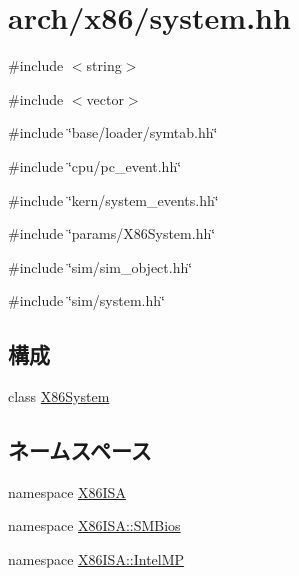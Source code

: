 \hypertarget{arch_2x86_2system_8hh}{
\section{arch/x86/system.hh}
\label{arch_2x86_2system_8hh}
}
{\ttfamily \#include $<$string$>$}\par
{\ttfamily \#include $<$vector$>$}\par
{\ttfamily \#include \char`\"{}base/loader/symtab.hh\char`\"{}}\par
{\ttfamily \#include \char`\"{}cpu/pc\_\-event.hh\char`\"{}}\par
{\ttfamily \#include \char`\"{}kern/system\_\-events.hh\char`\"{}}\par
{\ttfamily \#include \char`\"{}params/X86System.hh\char`\"{}}\par
{\ttfamily \#include \char`\"{}sim/sim\_\-object.hh\char`\"{}}\par
{\ttfamily \#include \char`\"{}sim/system.hh\char`\"{}}\par
\subsection*{構成}
\begin{DoxyCompactItemize}
\item 
class \hyperlink{classX86System}{X86System}
\end{DoxyCompactItemize}
\subsection*{ネームスペース}
\begin{DoxyCompactItemize}
\item 
namespace \hyperlink{namespaceX86ISA}{X86ISA}
\item 
namespace \hyperlink{namespaceX86ISA_1_1SMBios}{X86ISA::SMBios}
\item 
namespace \hyperlink{namespaceX86ISA_1_1IntelMP}{X86ISA::IntelMP}
\end{DoxyCompactItemize}
